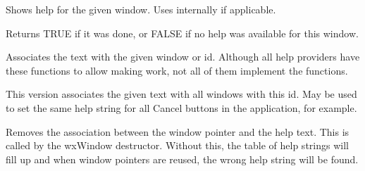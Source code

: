 \label{wxhelpprovidershowhelp}


Shows help for the given window. Uses  internally if
applicable.

Returns TRUE if it was done, or FALSE if no help was available
for this window.

\label{wxhelpprovideraddhelp}


Associates the text with the given window or id. Although all help
providers have these functions to allow making  
work, not all of them implement the functions.


This version associates the given text with all windows with this id.
May be used to set the same help string for all Cancel buttons in
the application, for example.

\label{wxhelpproviderremovehelp}


Removes the association between the window pointer and the help text. This is
called by the wxWindow destructor. Without this, the table of help strings will fill up
and when window pointers are reused, the wrong help string will be found.

